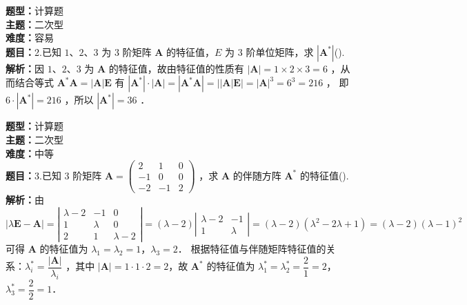 \documentclass{ctexart}
\newenvironment{question}[5]{%
	\noindent\textbf{题型：}#1\\
	\textbf{主题：}#2\\
	\textbf{难度：}#3\\
	\textbf{题目：}#4\\
	\textbf{解析：}#5\\
	\vspace{1em}
}{}
\begin{document}
	\begin{question}
		{计算题}
		{二次型}
		{容易}
		{2.已知 \(1 、 2 、 3\) 为 3 阶矩阵 \(\mathbf{A}\) 的特征值，\(E\) 为 3 阶单位矩阵，求 \(\left|\mathbf{A}^*\right|\)(\qquad). }
		{因 \(1、2、3\) 为 \(\mathbf{A}\) 的特征值，故由特征值的性质有 \(|\mathbf{A}| = 1 \times 2 \times 3 = 6\) ，从而结合等式 \(\mathbf{A}^* \mathbf{A} = |\mathbf{A}| \mathbf{E}\) 有 \(\left|\mathbf{A}^*\right| \cdot \left| \mathbf{A} \right| = \left| \mathbf{A}^* \mathbf{A} \right| = \left| |\mathbf{A}| \mathbf{E} \right| = |\mathbf{A}|^3 = 6^3 = 216\) ，
		即 \(6 \cdot \left|\mathbf{A}^*\right| = 216\) ，所以 \(\left|\mathbf{A}^*\right| = 36\) ．}
	\end{question}
	
	\begin{question}
		{计算题}
		{二次型}
		{中等}
		{3.已知 \(3\) 阶矩阵 \(\mathbf{A}=\left(\begin{array}{ccc}2 & 1 & 0 \\ -1 & 0 & 0 \\ -2 & -1 & 2\end{array}\right)\) ，求 \(\mathbf{A}\) 的伴随方阵 \(\mathbf{A}^*\) 的特征值(\qquad). }
		{由 \(|\lambda \mathbf{E}-\mathbf{A}| = \left|\begin{array}{ccc} \lambda - 2 & -1 & 0 \\ 1 & \lambda & 0 \\ 2 & 1 & \lambda - 2 \end{array}\right| = (\lambda - 2) \left|\begin{array}{cc} \lambda - 2 & -1 \\ 1 & \lambda \end{array}\right| = (\lambda - 2)(\lambda^2 - 2\lambda + 1) = (\lambda - 2)(\lambda - 1)^2\) 可得 \(\mathbf{A}\) 的特征值为 \(\lambda_1 = \lambda_2 = 1\)，\(\lambda_3 = 2\)．
		根据特征值与伴随矩阵特征值的关系：\(\lambda_i^* = \dfrac{|\mathbf{A}|}{\lambda_i}\) ，其中 \(|\mathbf{A}| = 1 \cdot 1 \cdot 2 = 2\)，故 \(\mathbf{A}^*\) 的特征值为 \(\lambda_1^* = \lambda_2^* = \dfrac{2}{1} = 2\)，\(\lambda_3^* = \dfrac{2}{2} = 1\)．}
	\end{question}
\end{document}
